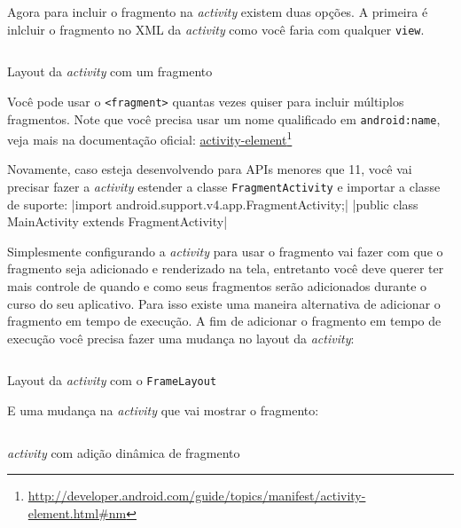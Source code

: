 \documentclass[a4paper,12pt,brazil,oneside]{book}
\begin{document}
\begin{singlespace}
Agora para incluir o fragmento na \emph{activity} existem duas opções. A primeira é inlcluir o fragmento no XML da \emph{activity} como você faria com qualquer \texttt{view}.

\begin{listing}[H]
\inputminted[linenos=true,fontsize=\small,frame=lines, framesep=2mm, tabsize=2,numbersep=5pt]{xml}{src/design/fragment-activity.xml}
\caption{Layout da \emph{activity} com um fragmento}
\end{listing}	

Você pode usar o \texttt{<fragment>} quantas vezes quiser para incluir múltiplos fragmentos.
Note que você precisa usar um nome qualificado em \texttt{android:name}, veja mais na documentação oficial: \href{http://developer.android.com/guide/topics/manifest/activity-element.html\#nm}{activity-element}\footnote{\href{http://developer.android.com/guide/topics/manifest/activity-element.html\#nm}{http://developer.android.com/guide/topics/manifest/activity-element.html\#nm}}

Novamente, caso esteja desenvolvendo para APIs menores que 11, você vai precisar fazer a \emph{activity} estender a classe \texttt{FragmentActivity} e importar a classe de suporte: |import android.support.v4.app.FragmentActivity;|
|public class MainActivity extends FragmentActivity|


Simplesmente configurando a \emph{activity} para usar o fragmento vai fazer com que o fragmento seja adicionado e renderizado na tela, entretanto você deve querer ter mais controle de quando e como seus fragmentos serão adicionados durante o curso do seu aplicativo. Para isso existe uma maneira alternativa de adicionar o fragmento em tempo de execução. A fim de adicionar o fragmento em tempo de execução você precisa fazer uma mudança no layout da \emph{activity}:

\begin{listing}[H]
\inputminted[linenos=true,fontsize=\small,frame=lines, framesep=2mm, tabsize=2,numbersep=5pt]{xml}{src/design/framelayout.xml}
\caption{Layout da \emph{activity} com o \texttt{FrameLayout}}
\end{listing}	

E uma mudança na \emph{activity} que vai mostrar o fragmento:

\begin{listing}[H]
\inputminted[linenos=true,fontsize=\small,frame=lines, framesep=2mm, tabsize=2,numbersep=5pt]{java}{src/design/activity-frag-dyn.java}
\caption{\emph{activity} com adição dinâmica de fragmento}
\end{listing}	


\end{singlespace}
\end{document}
